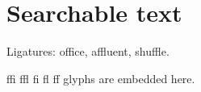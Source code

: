 \documentclass{article}
\begin{document}
\section{Searchable text}
Ligatures: office, affluent, shuffle.

ffi ffl fi fl ff glyphs are embedded here.
\end{document}
